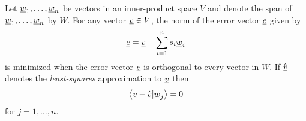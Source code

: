 \begin{theorem}
Let $\underline{w}_1, \ldots, \underline{w}_n$ be vectors in an inner-product space $V$ and denote the span of $\underline{w}_1, \ldots, \underline{w}_n$ by $W$.
For any vector $\underline{v} \in V$, the norm of the error vector $\underline{e}$ given by
\begin{equation} \label{equation:OrthogonalProjectionError}
\underline{e} = \underline{v} - \sum_{i=1}^n s_i \underline{w}_i
\end{equation}
is minimized when the error vector $\underline{e}$ is orthogonal to every vector in $W$.
If $\hat{\underline{v}}$ denotes the \emph{least-squares} approximation to $\underline{v}$ then
\begin{equation*}
\left\langle \underline{v} - \hat{\underline{v}} | \underline{w}_j \right\rangle = 0
\end{equation*}
for $j = 1, \ldots, n$.
\end{theorem}
